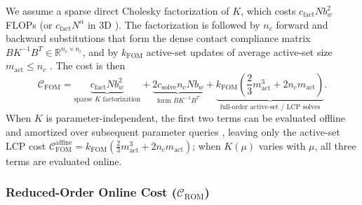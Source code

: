 \documentclass[11pt,a4paper]{article}
\begin{document}
We assume a sparse direct Cholesky factorization of \(K\), which costs \(c_{\text{fact}} N b_w^2\) FLOPs (or \(c_{\text{fact}} N^\alpha\) in 3D \cite{franceschini2022block}). The factorization is followed by \(n_c\) forward and backward substitutions that form the dense contact compliance matrix \(B K^{-1} B^T \in \mathbb{R}^{n_c \times n_c}\), and by \(k_{\text{FOM}}\) active-set updates of average active-set size \(m_{\text{act}} \le n_c\) \cite{balajewicz2016projection, leberre2022condition}. The cost is then
\begin{equation}\label{eq:cfom}\mathcal{C}_{\text{FOM}} = \underbrace{c_{\text{fact}} N b_w^2}_{\text{sparse } K \text{ factorization}} + \underbrace{2 c_{\text{solve}} n_c N b_w}_{\text{form } B K^{-1} B^T} + \underbrace{k_{\text{FOM}} \left( \frac{2}{3} m_{\text{act}}^3 + 2 n_c m_{\text{act}} \right)}_{\text{full-order active-set / LCP solves}}.\end{equation}
When \(K\) is parameter-independent, the first two terms can be evaluated offline and amortized over subsequent parameter queries \cite{pawar2025efficient}, leaving only the active-set LCP cost \(\mathcal{C}_{\text{FOM}}^{\text{affine}} = k_{\text{FOM}} (\frac{2}{3} m_{\text{act}}^3 + 2 n_c m_{\text{act}})\); when \(K(\mu)\) varies with \(\mu\), all three terms are evaluated online.

\hypertarget{reduced-order-online-cost-mathcalc_textrom}{%
\subsubsection{\texorpdfstring{Reduced-Order Online Cost (\(\mathcal{C}_{\text{ROM}}\))}{Reduced-Order Online Cost (\textbackslash mathcal\{C\}\_\{\textbackslash text\{ROM\}\})}}\label{reduced-order-online-cost-mathcalc_textrom}}
\end{document}
